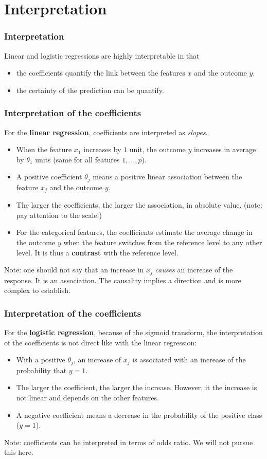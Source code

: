 \section{Interpretation}
\begin{frame}
\frametitle{Interpretation}
Linear and logistic regressions are highly interpretable in that 
\begin{itemize}
\item the coefficients quantify the link between the features $x$ and the outcome $y$.
\item the certainty of the prediction can be quantify.
\end{itemize}
\end{frame}
\begin{frame}
\frametitle{Interpretation of the coefficients}
For the {\bf linear regression}, coefficients are interpreted as {\it slopes}.
\begin{itemize}
\item When the feature $x_1$ increases by $1$ unit, the outcome $y$ increases in average by $\theta_1$ units (same for all features $1,\ldots,p$).
\item A positive coefficient $\theta_j$ means a positive linear association between the feature $x_j$ and the outcome $y$.
\item The larger the coefficients, the larger the association, in absolute value. (note: pay attention to the scale!)
\item For the categorical features, the coefficients estimate the average change in the outcome $y$ when the feature switches from the reference level to any other level. It is thus a {\bf contrast} with the reference level.  
\end{itemize}
\small
Note: one should not say that an increase in $x_j$ {\it causes} an increase of the response. It is an association. The causality implies a direction and is more complex to establish.
\normalsize
\end{frame}
\begin{frame}
\frametitle{Interpretation of the coefficients}
For the {\bf logistic regression}, because of the sigmoid transform, the interpretation of the coefficients is not direct like with the linear regression:
\begin{itemize}
\item With a positive $\theta_j$, an increase of $x_j$ is associated with an increase of the probability that $y=1$. 
\item The larger the coefficient, the larger the increase. However, it the increase is not linear and depends on the other features.
\item A negative coefficient means a decrease in the probability of the positive class ($y=1$).
\end{itemize}
Note: coefficients can be interpreted in terms of odds ratio. We will not pursue this here.
\end{frame}
